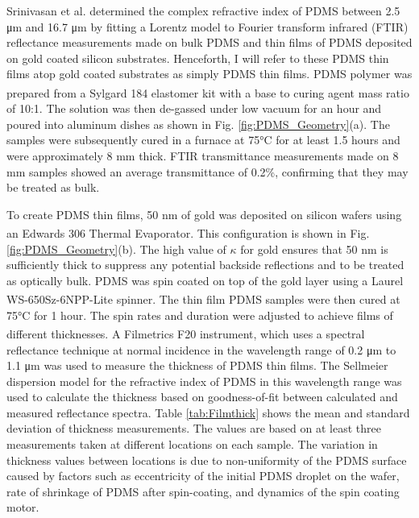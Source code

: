 Srinivasan et al. determined the complex refractive index of PDMS between 2.5 \si{\micro\meter} and 16.7 \si{\micro\meter} by fitting a Lorentz model to Fourier transform infrared (FTIR) reflectance measurements made on bulk PDMS and thin films of PDMS deposited on gold coated silicon substrates. Henceforth, I will refer to these PDMS thin films atop gold coated substrates as simply PDMS thin films. PDMS polymer was prepared from a Sylgard\textsuperscript{\textregistered} 184 elastomer kit with a base to curing agent mass ratio of 10:1. The solution was then de-gassed under low vacuum for an hour and poured into aluminum dishes as shown in Fig. \ref{fig:PDMS_Geometry}(a).  The samples were subsequently cured in a furnace at 75\si{\celsius} for at least 1.5 hours and were approximately 8 \si{\milli \meter} thick. FTIR transmittance measurements made on 8 \si{\milli \meter} samples showed an average transmittance of 0.2\%, confirming that they may be treated as bulk.

To create PDMS thin films, 50 \si{\nano\meter} of gold was deposited on silicon wafers using an Edwards 306\textsuperscript{\textregistered} Thermal Evaporator. This configuration is shown in Fig. \ref{fig:PDMS_Geometry}(b). The high value of $\kappa$ for gold ensures that 50 \si{\nano\meter} is sufficiently thick to suppress any potential backside reflections and to be treated as optically bulk.\cite{Ordal1985} PDMS was spin coated on top of the gold layer using a Laurel WS-650Sz-6NPP-Lite\textsuperscript{\textregistered} spinner. The thin film PDMS samples were then cured at 75\si{\celsius} for 1 hour. The spin rates and duration were adjusted to achieve films of different thicknesses. A Filmetrics F20\textsuperscript{\textregistered} instrument, which uses a spectral reflectance technique at normal incidence in the wavelength range of 0.2 \si{\micro\meter} to 1.1 \si{\micro\meter} was used to measure the thickness of PDMS thin films. The Sellmeier dispersion model for the refractive index of PDMS in this wavelength range\cite{Schneider2009} was used to calculate the thickness based on goodness-of-fit between calculated and measured reflectance spectra. Table \ref{tab:Filmthick} shows the mean and standard deviation of thickness measurements. The values are based on at least three measurements taken at different locations on each sample. The variation in thickness values between locations is due to non-uniformity of the PDMS surface caused by factors such as eccentricity of the initial PDMS droplet on the wafer, rate of shrinkage of PDMS after spin-coating, and dynamics of the spin coating motor.\cite{Krishnan2007}

